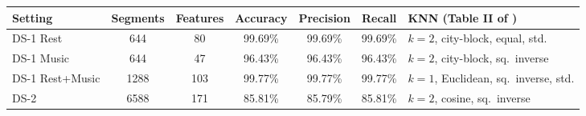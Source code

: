 \begin{tabular}{lcccccl}
\toprule
Setting & Segments & Features & Accuracy & Precision & Recall & KNN (Table II of \cite{chandela2025})\\
\midrule
DS-1 Rest & 644 & 80 & 99.69\% & 99.69\% & 99.69\% & $k{=}2$, city-block, equal, std. \\
DS-1 Music & 644 & 47 & 96.43\% & 96.43\% & 96.43\% & $k{=}2$, city-block, sq.\ inverse \\
DS-1 Rest+Music & 1288 & 103 & 99.77\% & 99.77\% & 99.77\% & $k{=}1$, Euclidean, sq.\ inverse, std. \\
DS-2 & 6588 & 171 & 85.81\% & 85.79\% & 85.81\% & $k{=}2$, cosine, sq.\ inverse \\
\bottomrule
\end{tabular}
